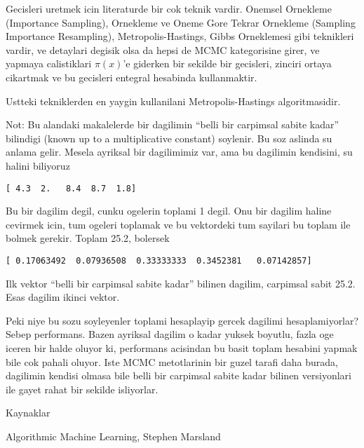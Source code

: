 \documentclass[12pt,fleqn]{article}\usepackage{../common}
\begin{document}
Gecisleri uretmek icin literaturde bir cok teknik vardir.  Onemsel
Ornekleme (Importance Sampling), Ornekleme ve Oneme Gore Tekrar Ornekleme
(Sampling Importance Resampling), Metropolis-Hastings, Gibbs Orneklemesi
gibi teknikleri vardir, ve detaylari degisik olsa da hepsi de MCMC
kategorisine girer, ve yapmaya calistiklari $\pi(x)$'e giderken bir sekilde
bir gecisleri, zinciri ortaya cikartmak ve bu gecisleri entegral hesabinda
kullanmaktir.

Ustteki tekniklerden en yaygin kullanilani Metropolis-Hastings
algoritmasidir. 

Not: Bu alandaki makalelerde bir dagilimin ``belli bir carpimsal sabite
kadar'' bilindigi (known up to a multiplicative constant) soylenir. Bu soz
aslinda su anlama gelir. Mesela ayriksal bir dagilimimiz var, ama bu
dagilimin kendisini, su halini biliyoruz

\verb![ 4.3  2.   8.4  8.7  1.8]!

Bu bir dagilim degil, cunku ogelerin toplami 1 degil. Onu bir dagilim
haline cevirmek icin, tum ogeleri toplamak ve bu vektordeki tum sayilari bu
toplam ile bolmek gerekir. Toplam 25.2, bolersek

\verb![ 0.17063492  0.07936508  0.33333333  0.3452381   0.07142857]!

Ilk vektor ``belli bir carpimsal sabite kadar'' bilinen dagilim, carpimsal
sabit 25.2. Esas dagilim ikinci vektor. 

Peki niye bu sozu soyleyenler toplami hesaplayip gercek dagilimi
hesaplamiyorlar? Sebep performans. Bazen ayriksal dagilim o kadar yuksek
boyutlu, fazla oge iceren bir halde oluyor ki, performans acisindan bu
basit toplam hesabini yapmak bile cok pahali oluyor. Iste MCMC metotlarinin
bir guzel tarafi daha burada, dagilimin kendisi olmasa bile belli bir
carpimsal sabite kadar bilinen versiyonlari ile gayet rahat bir sekilde
isliyorlar.

Kaynaklar

Algorithmic Machine Learning, Stephen Marsland
\end{document}
